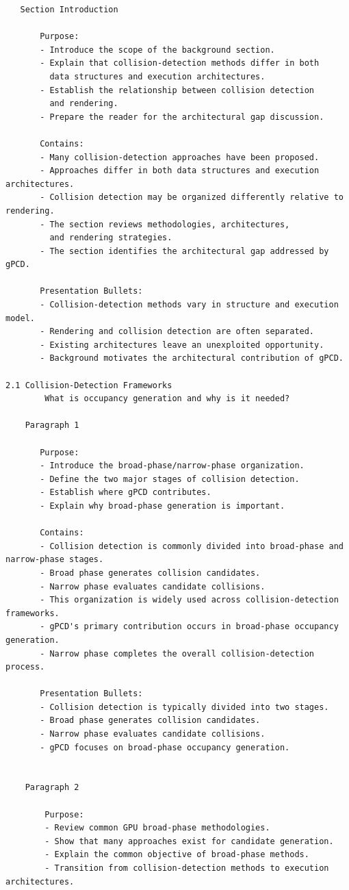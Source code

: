 \begin{verbatim}
   Section Introduction

	   Purpose:
	   - Introduce the scope of the background section.
	   - Explain that collision-detection methods differ in both
		 data structures and execution architectures.
	   - Establish the relationship between collision detection
		 and rendering.
	   - Prepare the reader for the architectural gap discussion.

	   Contains:
	   - Many collision-detection approaches have been proposed.
	   - Approaches differ in both data structures and execution architectures.
	   - Collision detection may be organized differently relative to rendering.
	   - The section reviews methodologies, architectures,
		 and rendering strategies.
	   - The section identifies the architectural gap addressed by gPCD.

	   Presentation Bullets:
	   - Collision-detection methods vary in structure and execution model.
	   - Rendering and collision detection are often separated.
	   - Existing architectures leave an unexploited opportunity.
	   - Background motivates the architectural contribution of gPCD.
   
2.1 Collision-Detection Frameworks
		What is occupancy generation and why is it needed?

	Paragraph 1

	   Purpose:
	   - Introduce the broad-phase/narrow-phase organization.
	   - Define the two major stages of collision detection.
	   - Establish where gPCD contributes.
	   - Explain why broad-phase generation is important.

	   Contains:
	   - Collision detection is commonly divided into broad-phase and narrow-phase stages.
	   - Broad phase generates collision candidates.
	   - Narrow phase evaluates candidate collisions.
	   - This organization is widely used across collision-detection frameworks.
	   - gPCD's primary contribution occurs in broad-phase occupancy generation.
	   - Narrow phase completes the overall collision-detection process.

	   Presentation Bullets:
	   - Collision detection is typically divided into two stages.
	   - Broad phase generates collision candidates.
	   - Narrow phase evaluates candidate collisions.
	   - gPCD focuses on broad-phase occupancy generation.
	   

	Paragraph 2

		Purpose:
		- Review common GPU broad-phase methodologies.
		- Show that many approaches exist for candidate generation.
		- Explain the common objective of broad-phase methods.
		- Transition from collision-detection methods to execution architectures.


\end{verbatim}
